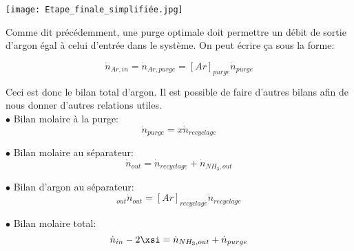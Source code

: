 \documentclass[a4paper, oneside, 12pt]{article}
\begin{document}
\texttt{[image: Etape\_finale\_simplifiée.jpg]} 

Comme dit précédemment, une purge optimale doit permettre un débit de sortie d'argon égal à celui d'entrée dans le système. On peut écrire ça sous la forme:

\begin{equation}
\dot{n}_{Ar,in}=\dot{n}_{Ar,purge}=[Ar]_{purge} \dot{n}_{purge}
\end{equation}

Ceci est donc le bilan total d'argon. Il est possible de faire d'autres bilans afin de nous donner d'autres relations utiles.\\

$\bullet$ Bilan molaire à la purge:
\begin{equation}
\dot{n}_{purge}=x \dot{n}_{recyclage}
\end{equation}

$\bullet$ Bilan molaire au séparateur:
\begin{equation}
\dot{n}_{out}=\dot{n}_{recyclage}+\dot{n}_{NH_3,out}
\end{equation}

$\bullet$ Bilan d'argon au séparateur:
\begin{equation}
[Ar]_{out} \dot{n}_{out}=[Ar]_{recyclage} \dot{n}_{recyclage}
\end{equation}

$\bullet$ Bilan molaire total:
\begin{equation}
\dot{n}_{in} - 2\xsi=\dot{n}_{NH_3,out} + \dot{n}_{purge}
\end{equation}
\end{document}

